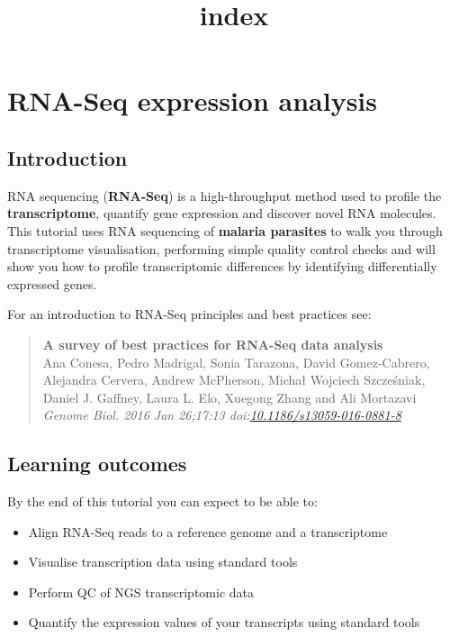 \documentclass[11pt]{article}
\title{index}
\providecommand{\tightlist}{%
      \setlength{\itemsep}{0pt}\setlength{\parskip}{0pt}}
\begin{document}
    \hypertarget{rna-seq-expression-analysis}{%
\section{RNA-Seq expression
analysis}\label{rna-seq-expression-analysis}}

    \hypertarget{introduction}{%
\subsection{Introduction}\label{introduction}}

RNA sequencing (\textbf{RNA-Seq}) is a high-throughput method used to
profile the \textbf{transcriptome}, quantify gene expression and
discover novel RNA molecules. This tutorial uses RNA sequencing of
\textbf{malaria parasites} to walk you through transcriptome
visualisation, performing simple quality control checks and will show
you how to profile transcriptomic differences by identifying
differentially expressed genes.

    For an introduction to RNA-Seq principles and best practices see:

\begin{quote}
\textbf{A survey of best practices for RNA-Seq data analysis}\\
Ana Conesa, Pedro Madrigal, Sonia Tarazona, David Gomez-Cabrero,
Alejandra Cervera, Andrew McPherson, Michał Wojciech Szcześniak, Daniel
J. Gaffney, Laura L. Elo, Xuegong Zhang and Ali Mortazavi\\
\textit{Genome Biol. 2016 Jan 26;17:13
doi:\href{https://genomebiology.biomedcentral.com/articles/10.1186/s13059-016-0881-8}{10.1186/s13059-016-0881-8}}
\end{quote}

    \hypertarget{learning-outcomes}{%
\subsection{Learning outcomes}\label{learning-outcomes}}

By the end of this tutorial you can expect to be able to:

\begin{itemize}
\tightlist
\item
  Align RNA-Seq reads to a reference genome and a transcriptome
\item
  Visualise transcription data using standard tools
\item
  Perform QC of NGS transcriptomic data
\item
  Quantify the expression values of your transcripts using standard
  tools
\end{itemize}
\end{document}

